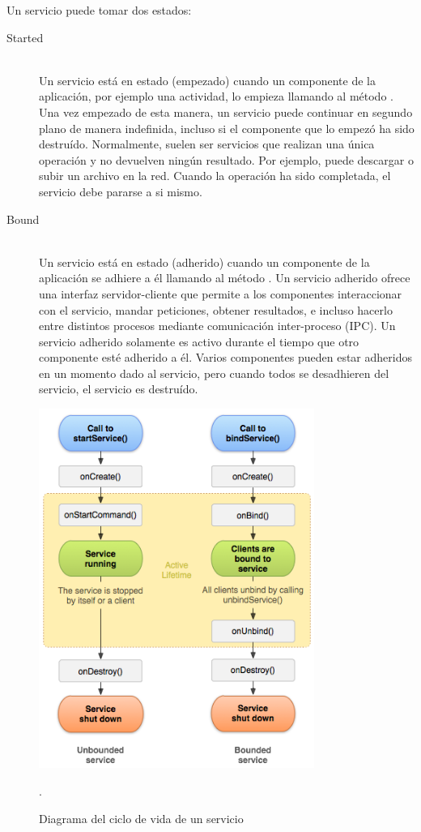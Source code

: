 Un servicio puede tomar dos estados:

\begin{description}
    \item[Started] \hfill \\
    Un servicio está en estado  (empezado) cuando un componente de la aplicación, por ejemplo una actividad, lo empieza llamando al método . Una vez empezado de esta manera, un servicio puede continuar en segundo plano de manera indefinida, incluso si el componente que lo empezó ha sido destruído. Normalmente, suelen ser servicios que realizan una única operación y no devuelven ningún resultado. Por ejemplo, puede descargar o subir un archivo en la red. Cuando la operación ha sido completada, el servicio debe pararse a si mismo.
    
    \item[Bound] \hfill \\
    Un servicio está en estado  (adherido) cuando un componente de la aplicación se adhiere a él llamando al método . Un servicio adherido ofrece una interfaz servidor-cliente que permite a los componentes interaccionar con el servicio, mandar peticiones, obtener resultados, e incluso hacerlo entre distintos procesos mediante comunicación inter-proceso (IPC). Un servicio adherido solamente es activo durante el tiempo que otro componente esté adherido a él. Varios componentes pueden estar adheridos en un momento dado al servicio, pero cuando todos se desadhieren del servicio, el servicio es destruído.

\end{description}

\begin{figure}[h] \centering
    \includegraphics[width=9cm]{graphs/service_lifecycle.png} \caption{Diagrama del ciclo de vida de un servicio \cite{androiddevguide}}.\label{fig:diagrama:ServiceLifecycle}
\end{figure}

